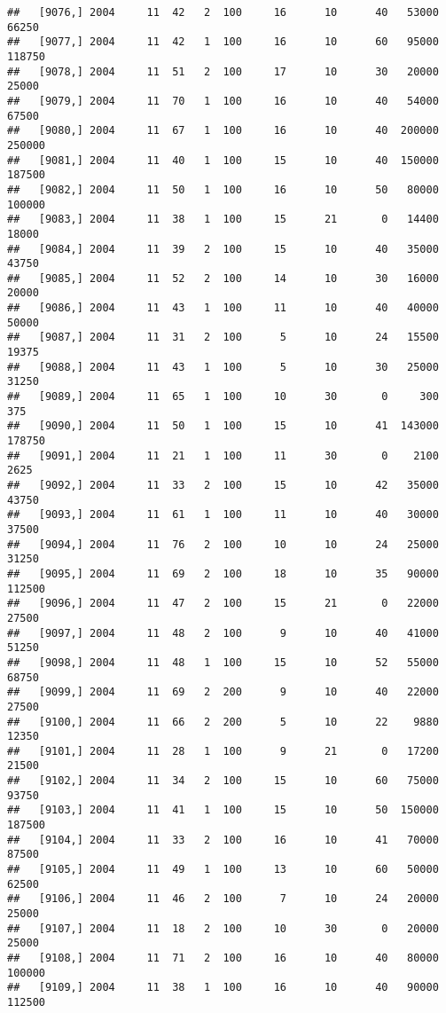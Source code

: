 \documentclass{article}\usepackage[]{graphicx}\usepackage[]{color}
\makeatletter
\newenvironment{kframe}{%
 \def\at@end@of@kframe{}%
 \ifinner\ifhmode%
  \def\at@end@of@kframe{\end{minipage}}%
  \begin{minipage}{\columnwidth}%
 \fi\fi%
 \def\FrameCommand##1{\hskip\@totalleftmargin \hskip-\fboxsep
 \colorbox{shadecolor}{##1}\hskip-\fboxsep
     \hskip-\linewidth \hskip-\@totalleftmargin \hskip\columnwidth}%
 \MakeFramed {\advance\hsize-\width
   \@totalleftmargin\z@ \linewidth\hsize
   \@setminipage}}%
 {\par\unskip\endMakeFramed%
 \at@end@of@kframe}
\newenvironment{knitrout}{}{} %
\makeatother
\begin{document}
\begin{knitrout}
\begin{kframe}
\begin{verbatim}
##   [9076,] 2004     11  42   2  100     16      10      40   53000   66250
##   [9077,] 2004     11  42   1  100     16      10      60   95000  118750
##   [9078,] 2004     11  51   2  100     17      10      30   20000   25000
##   [9079,] 2004     11  70   1  100     16      10      40   54000   67500
##   [9080,] 2004     11  67   1  100     16      10      40  200000  250000
##   [9081,] 2004     11  40   1  100     15      10      40  150000  187500
##   [9082,] 2004     11  50   1  100     16      10      50   80000  100000
##   [9083,] 2004     11  38   1  100     15      21       0   14400   18000
##   [9084,] 2004     11  39   2  100     15      10      40   35000   43750
##   [9085,] 2004     11  52   2  100     14      10      30   16000   20000
##   [9086,] 2004     11  43   1  100     11      10      40   40000   50000
##   [9087,] 2004     11  31   2  100      5      10      24   15500   19375
##   [9088,] 2004     11  43   1  100      5      10      30   25000   31250
##   [9089,] 2004     11  65   1  100     10      30       0     300     375
##   [9090,] 2004     11  50   1  100     15      10      41  143000  178750
##   [9091,] 2004     11  21   1  100     11      30       0    2100    2625
##   [9092,] 2004     11  33   2  100     15      10      42   35000   43750
##   [9093,] 2004     11  61   1  100     11      10      40   30000   37500
##   [9094,] 2004     11  76   2  100     10      10      24   25000   31250
##   [9095,] 2004     11  69   2  100     18      10      35   90000  112500
##   [9096,] 2004     11  47   2  100     15      21       0   22000   27500
##   [9097,] 2004     11  48   2  100      9      10      40   41000   51250
##   [9098,] 2004     11  48   1  100     15      10      52   55000   68750
##   [9099,] 2004     11  69   2  200      9      10      40   22000   27500
##   [9100,] 2004     11  66   2  200      5      10      22    9880   12350
##   [9101,] 2004     11  28   1  100      9      21       0   17200   21500
##   [9102,] 2004     11  34   2  100     15      10      60   75000   93750
##   [9103,] 2004     11  41   1  100     15      10      50  150000  187500
##   [9104,] 2004     11  33   2  100     16      10      41   70000   87500
##   [9105,] 2004     11  49   1  100     13      10      60   50000   62500
##   [9106,] 2004     11  46   2  100      7      10      24   20000   25000
##   [9107,] 2004     11  18   2  100     10      30       0   20000   25000
##   [9108,] 2004     11  71   2  100     16      10      40   80000  100000
##   [9109,] 2004     11  38   1  100     16      10      40   90000  112500

\end{verbatim}
\end{kframe}
\end{knitrout}
\end{document}
